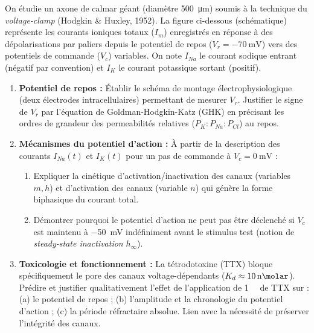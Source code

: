 \documentclass[11pt]{article}
\begin{document}
\begin{exercice}
On étudie un axone de calmar géant (diamètre \SI{500}{\micro\metre}) soumis à la technique du \textit{voltage-clamp} (Hodgkin \& Huxley, 1952). La figure ci-dessous (schématique) représente les courants ioniques totaux ($I_m$) enregistrés en réponse à des dépolarisations par paliers depuis le potentiel de repos ($V_r = \SI{-70}{\milli\volt}$) vers des potentiels de commande ($V_c$) variables. On note $I_{Na}$ le courant sodique entrant (négatif par convention) et $I_K$ le courant potassique sortant (positif).

\begin{enumerate}
    \item \textbf{Potentiel de repos :} Établir le schéma de montage électrophysiologique (deux électrodes intracellulaires) permettant de mesurer $V_r$. Justifier le signe de $V_r$ par l'équation de Goldman-Hodgkin-Katz (GHK) en précisant les ordres de grandeur des permeabilités relatives ($P_K : P_{Na} : P_{Cl}$) au repos.
    \item \textbf{Mécanismes du potentiel d'action :} À partir de la description des courants $I_{Na}(t)$ et $I_K(t)$ pour un pas de commande à $V_c = \SI{0}{\milli\volt}$ :
    \begin{enumerate}
        \item Expliquer la cinétique d'activation/inactivation des canaux  (variables $m, h$) et d'activation des canaux  (variable $n$) qui génère la forme biphasique du courant total.
        \item Démontrer pourquoi le potentiel d'action ne peut pas être déclenché si $V_c$ est maintenu à \SI{-50}{\milli\volt} indéfiniment avant le stimulus test (notion de \textit{steady-state inactivation} $h_\infty$).
    \end{enumerate}
    \item \textbf{Toxicologie et fonctionnement :} La tétrodotoxine (TTX) bloque spécifiquement le pore des canaux  voltage-dépendants ($K_d \approx \SI{10}{\nano\molar}$). Prédire et justifier qualitativement l'effet de l'application de \SI{1}{\micro\molar} de TTX sur : (a) le potentiel de repos ; (b) l'amplitude et la chronologie du potentiel d'action ; (c) la période réfractaire absolue. Lien avec la nécessité de préserver l'intégrité des canaux.
\end{enumerate}
\end{exercice}
\end{document}
